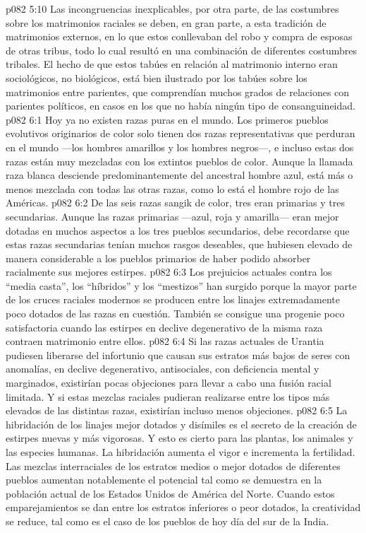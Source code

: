 \vs p082 5:10 Las incongruencias inexplicables, por otra parte, de las costumbres sobre los matrimonios raciales se deben, en gran parte, a esta tradición de matrimonios externos, en lo que estos conllevaban del robo y compra de esposas de otras tribus, todo lo cual resultó en una combinación de diferentes costumbres tribales. El hecho de que estos tabúes en relación al matrimonio interno eran sociológicos, no biológicos, está bien ilustrado por los tabúes sobre los matrimonios entre parientes, que comprendían muchos grados de relaciones con parientes políticos, en casos en los que no había ningún tipo de consanguineidad.
\vs p082 6:1 Hoy ya no existen razas puras en el mundo. Los primeros pueblos evolutivos originarios de color solo tienen dos razas representativas que perduran en el mundo ---los hombres amarillos y los hombres negros---, e incluso estas dos razas están muy mezcladas con los extintos pueblos de color. Aunque la llamada raza blanca desciende predominantemente del ancestral hombre azul, está más o menos mezclada con todas las otras razas, como lo está el hombre rojo de las Américas.
\vs p082 6:2 De las seis razas sangik de color, tres eran primarias y tres secundarias. Aunque las razas primarias ---azul, roja y amarilla--- eran mejor dotadas en muchos aspectos a los tres pueblos secundarios, debe recordarse que estas razas secundarias tenían muchos rasgos deseables, que hubiesen elevado de manera considerable a los pueblos primarios de haber podido absorber racialmente sus mejores estirpes.
\vs p082 6:3 Los prejuicios actuales contra los “media casta”, los “híbridos” y los “mestizos” han surgido porque la mayor parte de los cruces raciales modernos se producen entre los linajes extremadamente poco dotados de las razas en cuestión. También se consigue una progenie poco satisfactoria cuando las estirpes en declive degenerativo de la misma raza contraen matrimonio entre ellos.
\vs p082 6:4 Si las razas actuales de Urantia pudiesen liberarse del infortunio que causan sus estratos más bajos de seres con anomalías, en declive degenerativo, antisociales, con deficiencia mental y marginados, existirían pocas objeciones para llevar a cabo una fusión racial limitada. Y si estas mezclas raciales pudieran realizarse entre los tipos más elevados de las distintas razas, existirían incluso menos objeciones.
\vs p082 6:5 La hibridación de los linajes mejor dotados y disímiles es el secreto de la creación de estirpes nuevas y más vigorosas. Y esto es cierto para las plantas, los animales y las especies humanas. La hibridación aumenta el vigor e incrementa la fertilidad. Las mezclas interraciales de los estratos medios o mejor dotados de diferentes pueblos aumentan notablemente el potencial  tal como se demuestra en la población actual de los Estados Unidos de América del Norte. Cuando estos emparejamientos se dan entre los estratos inferiores o peor dotados, la creatividad se reduce, tal como es el caso de los pueblos de hoy día del sur de la India.
